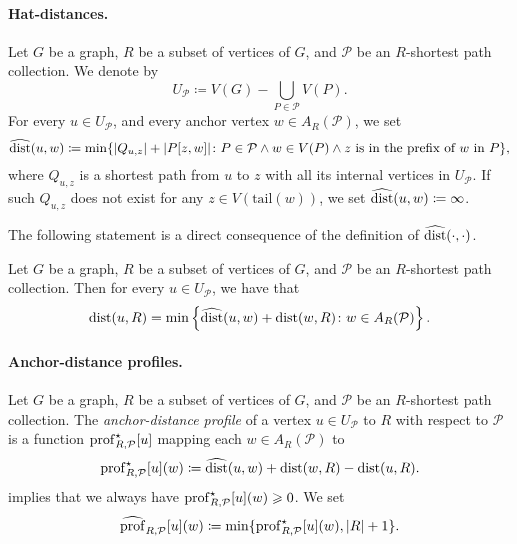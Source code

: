 \paragraph{Hat-distances.}
Let $G$ be a graph, $R$ be a subset of vertices of $G$, and $\mathcal{P}$ be an $R$-shortest path collection.
We denote by $$U_{\mathcal{P}}\coloneqq V(G)-\bigcup_{P\in\mathcal{P}}V(P).$$
For every $u\in U_{\mathcal{P}}$,
and every anchor vertex $w\in A_R(\mathcal{P})$,
we set 
\[ \widehat{\mathrm{dist}}(u,w)\coloneqq \min\{|Q_{u,z}|+|P[z,w]|\colon
P \in \mathcal{P} \wedge w \in V(P) \wedge 
z\text{ is in the prefix of $w$ in $P$}\},\] 
where $Q_{u,z}$ is a shortest path from $u$ to $z$ with all its internal vertices in $U_{\mathcal{P}}$.
If such $Q_{u,z}$ does not exist for any $z \in V(\mathrm{tail}(w))$,
we set $\widehat{\mathrm{dist}}(u, w) \coloneqq \infty$. 

The following statement is a direct consequence of the definition of $\widehat{\mathrm{dist}}(\cdot,\cdot)$.

\begin{observation}
  \label{obs:dist}
  Let $G$ be a graph, $R$ be a subset of vertices of $G$, and $\mathcal{P}$ be
  an $R$-shortest path collection.
  Then for every $u\in U_{\mathcal{P}}$, we have that $$\mathrm{dist}(u,R)=\min \left\{\widehat{\mathrm{dist}}(u,w)+ \mathrm{dist}(w,R)
  \colon w\in A_R(\mathcal{P})\right\}.$$
\end{observation}

\paragraph{Anchor-distance profiles.}
Let $G$ be a graph, $R$ be a subset of vertices of $G$,  and $\mathcal{P}$
be an $R$-shortest path collection.
The \emph{anchor-distance profile} of a vertex $u\in U_{\mathcal{P}}$ to $R$ with respect to $\mathcal{P}$
is a function $\mathrm{prof}^\star_{R,\mathcal{P}}[u]$ mapping each $w \in A_R(\mathcal{P})$ to
\[\mathrm{prof}^\star_{R,\mathcal{P}}[u](w) \coloneqq \widehat{\mathrm{dist}}(u,w) + \mathrm{dist}(w,R)
 - \mathrm{dist}(u,R).\]
 implies that we always have $\mathrm{prof}^\star_{R,\mathcal{P}}[u](w) \geqslant 0$.
We set
\[\widehat{\mathrm{prof}}_{R,\mathcal{P}}[u](w)\coloneqq\min\{\mathrm{prof}^\star_{R,\mathcal{P}}[u](w),|R|+1\}.\]

